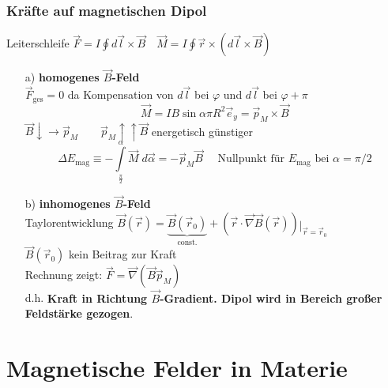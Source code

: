 \documentclass[titlepage,12pt,a4paper,ngerman]{report}
\newcommand{\tx}[1]{\textrm{#1}}
\newcommand{\ub}[1]{\underbrace{#1}}
\begin{document}
\subsubsection{Kräfte auf magnetischen Dipol}
Leiterschleife $ \vec{F} = I \oint d\vec{l} \times \vec{B} \quad \vec{M} = I \oint \vec{r} \times (d\vec{l} \times \vec{B}) $\\
\begin{itemize}
	\item[a)] \textbf{homogenes $ \vec{B} $-Feld}\\
	$ \vec{F}_{\tx{ges}} = 0 $ da Kompensation von $ d\vec{l} $ bei $ \varphi $ und $ d\vec{l} $ bei $ \varphi + \pi $\\
	$$ \vec{M} = I B \sin \alpha \pi R^2 \vec{e}_y = \vec{p}_M \times \vec{B} $$
	$ \vec{B} \downarrow \rightarrow \vec{p}_M \qquad \vec{p}_M \uparrow \uparrow \vec{B} $ energetisch günstiger\\
	$$ \Delta E_{\tx{mag}} \equiv - \int \limits _{\frac{\pi}{2}} ^{\alpha} \vec{M} \; d \vec{\alpha} = - \vec{p}_M \vec{B} \quad \tx{ Nullpunkt für } E_{\tx{mag}} \tx{ bei } \alpha = \pi / 2 $$
	\item[b)] \textbf{inhomogenes $ \vec{B} $-Feld}\\
	Taylorentwicklung $ \vec{B} (\vec{r}) = \ub{\vec{B} (\vec{r}_0 )}_{\tx{const.}} + (\vec{r} \cdot \vec{\nabla} \vec{B}( \vec{r} )) \mathop{\vert}_{\vec{r} = \vec{r}_0} $\\
	$ \vec{B} (\vec{r}_0) $ kein Beitrag zur Kraft\\
	Rechnung zeigt: $ \vec{F} = \vec{\nabla} ( \vec{B} \vec{p}_M) $\\
	d.h. \textbf{Kraft in Richtung $\vec{B}$-Gradient. Dipol wird in Bereich großer Feldstärke gezogen}.
\end{itemize}


\section{Magnetische Felder in Materie}
\end{document}
